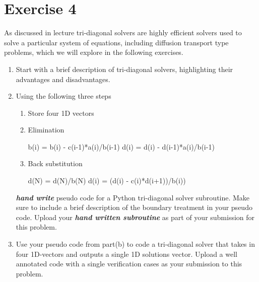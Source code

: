\section{Exercise 4}
As discussed in lecture tri-diagonal solvers are highly efficient
solvers used to solve a particular system of equations, including
diffusion transport type problems, which we will explore in the following
exercises. 
\begin{enumerate}[label=(\alph*)]
    \item Start with a brief description of tri-diagonal solvers,
        highlighting their advantages and disadvantages.
        
    \item Using the following three steps
        \begin{enumerate}[label=(\arabic*)]
            \item Store four 1D vectors 
            \item Elimination
                \begin{algorithmic}
                    \STATE b(i) = b(i) - c(i-1)*a(i)/b(i-1)
                    \STATE d(i) = d(i) - d(i-1)*a(i)/b(i-1)
                    \ENDFOR
                \end{algorithmic}
            \item Back substitution 
                \begin{algorithmic}
                    \STATE d(N) = d(N)/b(N)
                    \STATE d(i) = (d(i) - c(i)*d(i+1))/b(i))
                    \ENDFOR
                \end{algorithmic}
        \end{enumerate}
    \emph{\textbf{hand write}} pseudo code for a Python tri-diagonal solver
        subroutine. Make sure to include a brief description of the
        boundary treatment in your pseudo code. Upload your
        \emph{\textbf{hand written subroutine}} as part of your submission
        for this problem.
    
    \item Use your pseudo code from part(b) to code a tri-diagonal solver
        that takes in four 1D-vectors and outputs a single 1D solutions
        vector.  Upload a well annotated code with a single verification
        cases as your submission to this problem.
\end{enumerate}
